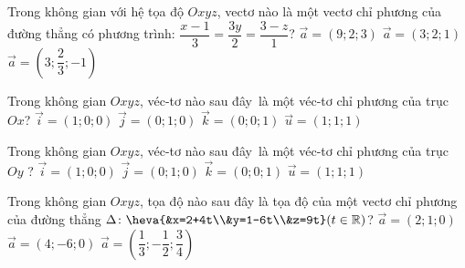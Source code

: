 \begin{ex}%
	Trong không gian với hệ tọa  độ $Oxyz$, vectơ nào là một vectơ chỉ phương của đường thẳng có phương trình: $\dfrac{x-1}{3}=\dfrac{3 y}{2}=\dfrac{3-z}{1}$?
		{$\overrightarrow{a}=(9; 2;  3)$}
		{$\overrightarrow{a}=(3;  2; 1)$}
		{\True $\overrightarrow{a}=\left(3;  \dfrac{2}{3};-1\right)$}
\end{ex}

\begin{ex}%
	Trong không gian $ Oxyz$, véc-tơ nào sau đây~là một véc-tơ chỉ phương của  trục $Ox$?
	\choice 
		{\True ${\overrightarrow{i}}=\left(1;0;0\right)$}
		{$\overrightarrow{j}=\left(0;1;0\right)$}
		 {${\overrightarrow{k}}=\left(0;0;1\right)$}
		 {${\overrightarrow{u}}=\left(1;1;1\right)$}
\end{ex}

\begin{ex}%
	Trong không gian $ Oxyz$, véc-tơ  nào sau đây~là một véc-tơ chỉ phương của trục $Oy$ ?
	\choice 
		{${\overrightarrow{i}}=\left(1;0;0\right)$} 
		 {\True $\overrightarrow{j}=\left(0;1;0\right)$}
		 {${\overrightarrow{k}}=\left(0;0;1\right)$}
		{${\overrightarrow{u}}=\left(1;1;1\right)$} 
\end{ex}

\begin{ex}%
	Trong không gian $Oxyz$, tọa độ nào sau đây là tọa độ của một  vectơ chỉ phương của đường thẳng
	$\Delta \colon \heva{&x=2+4t\\&y=1-6t\\&z=9t}(t\in\mathbb{R})$? 
		{$\overrightarrow{a}=(2;1;0)$} 
		{$\overrightarrow{a}=(4;-6;0)$} 
		{\True  $\overrightarrow{a}=\left(\dfrac{1}{3};-\dfrac{1}{2};\dfrac{3}{4}\right)$}
\end{ex}

